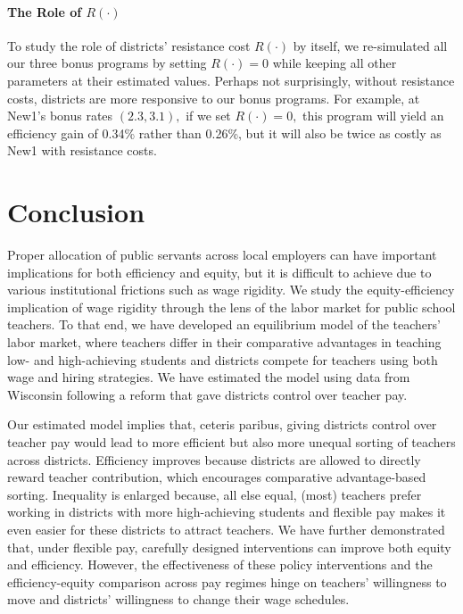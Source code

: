 \documentclass[notitlepage,12pt]{article}%
\begin{document}
\paragraph{The Role of $R\left(  \cdot\right)  $}

To study the role of districts' resistance cost $R\left(  \cdot\right)  $ by
itself, we re-simulated all our three bonus programs by setting $R\left(
\cdot\right)  =0$ while keeping all other parameters at their estimated
values. Perhaps not surprisingly, without resistance costs, districts are more
responsive to our bonus programs. For example, at New1's bonus rates
$(2.3,3.1),$ if we set $R\left(  \cdot\right)  =0,$ this program will yield an
efficiency gain of 0.34\% rather than 0.26\%, but it will also be twice as
costly as New1 with resistance costs.

\section{Conclusion}

Proper allocation of public servants across local employers can have important
implications for both efficiency and equity, but it is difficult to achieve
due to various institutional frictions such as wage rigidity. We study the
equity-efficiency implication of wage rigidity through the lens of the labor
market for public school teachers. To that end, we have developed an
equilibrium model of the teachers' labor market, where teachers differ in
their comparative advantages in teaching low- and high-achieving students and
districts compete for teachers using both wage and hiring strategies. We have
estimated the model using data from Wisconsin following a reform that gave
districts control over teacher pay. %

Our estimated model implies that, ceteris paribus, giving districts control
over teacher pay would lead to more efficient but also more unequal sorting of
teachers across districts. Efficiency improves because districts are allowed
to directly reward teacher contribution, which encourages comparative
advantage-based sorting. Inequality is enlarged because, all else equal,
(most) teachers prefer working in districts with more high-achieving students
and flexible pay makes it even easier for these districts to attract teachers.
We have further demonstrated that, under flexible pay, carefully designed
interventions can improve both equity and efficiency. However, the
effectiveness of these policy interventions and the efficiency-equity comparison across pay regimes hinge on teachers' willingness to
move and districts' willingness to change their wage schedules.
\end{document}
